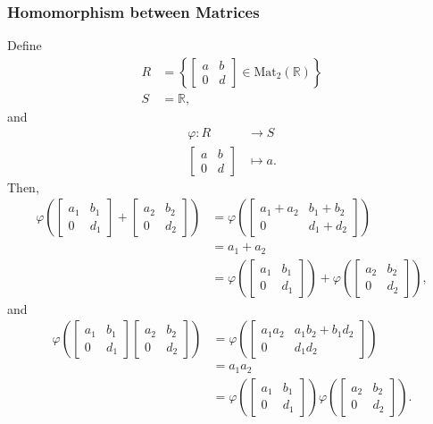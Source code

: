 \documentclass[10pt]{extarticle}
\newcommand{\R}{\mathbb{R}}
\begin{document}
  \subsubsection{Homomorphism between Matrices}%
  Define
  \begin{align*}
    R &= \left\{ \begin{bmatrix}a&b\\0&d\end{bmatrix}\in \text{Mat}_{2}(\R)\right\}\\
    S &= \R,
  \end{align*}
  and
  \begin{align*}
    \varphi:R&\rightarrow S\\
    \begin{bmatrix}a&b\\0&d\end{bmatrix}&\mapsto a.
  \end{align*}
  Then,
  \begin{align*}
    \varphi \left(\begin{bmatrix}a_1&b_1\\0&d_1\end{bmatrix}+\begin{bmatrix}a_2&b_2\\0&d_2\end{bmatrix}\right) &= \varphi \left(\begin{bmatrix}a_1+a_2&b_1+b_2\\0&d_1+d_2\end{bmatrix}\right)\\
                                    &= a_1 + a_2\\
                                    &= \varphi \left(\begin{bmatrix}a_1&b_1\\0&d_1\end{bmatrix}\right) + \varphi \left(\begin{bmatrix}a_2&b_2\\0&d_2\end{bmatrix}\right),
  \end{align*}
  and
  \begin{align*}
    \varphi \left(\begin{bmatrix}a_1&b_1\\0&d_1\end{bmatrix}\begin{bmatrix}a_2&b_2\\0&d_2\end{bmatrix}\right) &= \varphi \left(\begin{bmatrix}a_1a_2&a_1b_2 + b_1d_2\\0&d_1d_2\end{bmatrix}\right)\\
                                    &= a_1 a_2\\
                                    &= \varphi \left(\begin{bmatrix}a_1&b_1\\0&d_1\end{bmatrix}\right)  \varphi \left(\begin{bmatrix}a_2&b_2\\0&d_2\end{bmatrix}\right).
  \end{align*}
\end{document}

